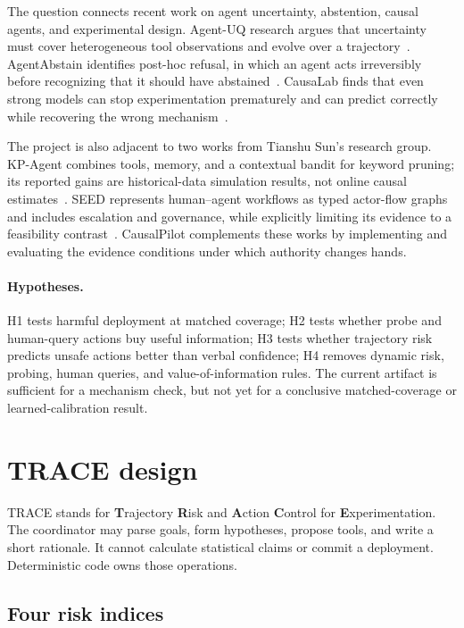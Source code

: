 \documentclass[11pt,twocolumn]{article}
\begin{document}
The question connects recent work on agent uncertainty, abstention, causal agents, and experimental design. Agent-UQ research argues that uncertainty must cover heterogeneous tool observations and evolve over a trajectory~\cite{oh2026uq}. AgentAbstain identifies post-hoc refusal, in which an agent acts irreversibly before recognizing that it should have abstained~\cite{liu2026abstain}. CausaLab finds that even strong models can stop experimentation prematurely and can predict correctly while recovering the wrong mechanism~\cite{yang2026causalab}.

The project is also adjacent to two works from Tianshu Sun's research group. KP-Agent combines tools, memory, and a contextual bandit for keyword pruning; its reported gains are historical-data simulation results, not online causal estimates~\cite{long2026kp}. SEED represents human--agent workflows as typed actor-flow graphs and includes escalation and governance, while explicitly limiting its evidence to a feasibility contrast~\cite{zhang2026seed}. CausalPilot complements these works by implementing and evaluating the evidence conditions under which authority changes hands.

\paragraph{Hypotheses.} H1 tests harmful deployment at matched coverage; H2 tests whether probe and human-query actions buy useful information; H3 tests whether trajectory risk predicts unsafe actions better than verbal confidence; H4 removes dynamic risk, probing, human queries, and value-of-information rules. The current artifact is sufficient for a mechanism check, but not yet for a conclusive matched-coverage or learned-calibration result.

\section{TRACE design}

TRACE stands for \textbf{T}rajectory \textbf{R}isk and \textbf{A}ction \textbf{C}ontrol for \textbf{E}xperimentation. The coordinator may parse goals, form hypotheses, propose tools, and write a short rationale. It cannot calculate statistical claims or commit a deployment. Deterministic code owns those operations.

\subsection{Four risk indices}
\end{document}
